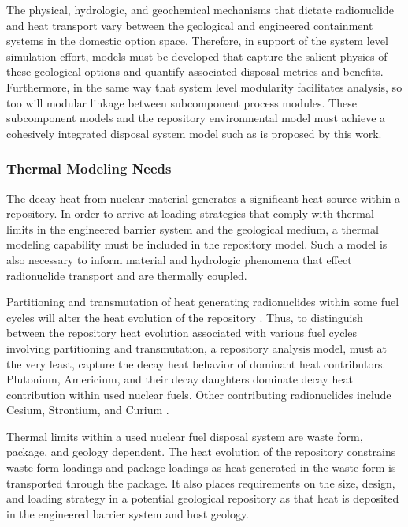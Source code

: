
The physical, hydrologic, and geochemical mechanisms that dictate 
radionuclide and heat transport vary between the geological and engineered 
containment systems in the domestic option space.  Therefore, in support of the 
system level simulation effort, models must be developed that capture the 
salient physics of these geological options and quantify associated disposal 
metrics and benefits.  Furthermore, in the same way that system level modularity 
facilitates analysis, so too will modular linkage between subcomponent process 
modules. These subcomponent models and the repository environmental model must 
achieve a cohesively integrated disposal system model such as is proposed by 
this work. 


\subsubsection{Thermal Modeling Needs}
The decay heat from nuclear material generates a significant heat source within a 
repository. In order to arrive at loading strategies that comply with thermal 
limits in the engineered barrier system and the geological medium, a thermal 
modeling capability must be included in the repository model. Such a model is 
also necessary to inform material and hydrologic phenomena that effect 
radionuclide transport and are thermally coupled. 

Partitioning and transmutation of heat generating radionuclides within  
some fuel cycles will alter the heat evolution of the repository 
\cite{swift_applying_2010}. Thus, to distinguish  between the repository heat 
evolution associated with various fuel cycles involving partitioning and 
transmutation, a repository analysis model, must at the very least, 
capture the decay heat behavior of dominant heat contributors.  Plutonium, 
Americium, and their decay daughters dominate decay heat contribution within 
used nuclear fuels. Other contributing radionuclides include Cesium, Strontium, 
and Curium \cite{piet_which_2007}. 

Thermal limits within a used nuclear fuel disposal system are waste form, 
package, and geology dependent. The heat evolution of the repository 
constrains waste form loadings and package loadings as heat 
generated in the waste form is transported through the package. It 
also places requirements on the size, design, and loading strategy in a 
potential geological repository as that heat is deposited in the engineered 
barrier system and host geology.

